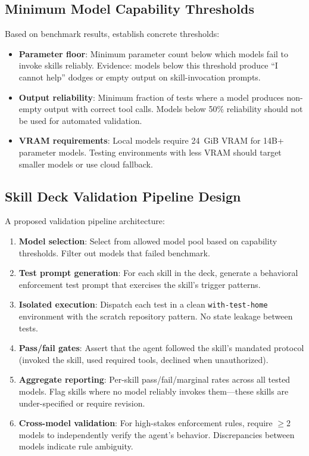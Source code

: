 \documentclass[11pt,a4paper]{article}
\begin{document}
\subsection{Minimum Model Capability Thresholds}

Based on benchmark results, establish concrete thresholds:
\begin{itemize}
    \item \textbf{Parameter floor}: Minimum parameter count below which models fail to invoke skills reliably. Evidence: models below this threshold produce ``I cannot help'' dodges or empty output on skill-invocation prompts.
    \item \textbf{Output reliability}: Minimum fraction of tests where a model produces non-empty output with correct tool calls. Models below 50\% reliability should not be used for automated validation.
    \item \textbf{VRAM requirements}: Local models require 24~GiB VRAM for 14B+ parameter models. Testing environments with less VRAM should target smaller models or use cloud fallback.
\end{itemize}

\subsection{Skill Deck Validation Pipeline Design}

A proposed validation pipeline architecture:

\begin{enumerate}[label=\textbf{Step \arabic*.}]
    \item \textbf{Model selection}: Select from allowed model pool based on capability thresholds. Filter out models that failed benchmark.
    \item \textbf{Test prompt generation}: For each skill in the deck, generate a behavioral enforcement test prompt that exercises the skill's trigger patterns.
    \item \textbf{Isolated execution}: Dispatch each test in a clean \texttt{with-test-home} environment with the scratch repository pattern. No state leakage between tests.
    \item \textbf{Pass/fail gates}: Assert that the agent followed the skill's mandated protocol (invoked the skill, used required tools, declined when unauthorized).
    \item \textbf{Aggregate reporting}: Per-skill pass/fail/marginal rates across all tested models. Flag skills where no model reliably invokes them—these skills are under-specified or require revision.
    \item \textbf{Cross-model validation}: For high-stakes enforcement rules, require $\geq$2 models to independently verify the agent's behavior. Discrepancies between models indicate rule ambiguity.
\end{enumerate}
\end{document}
